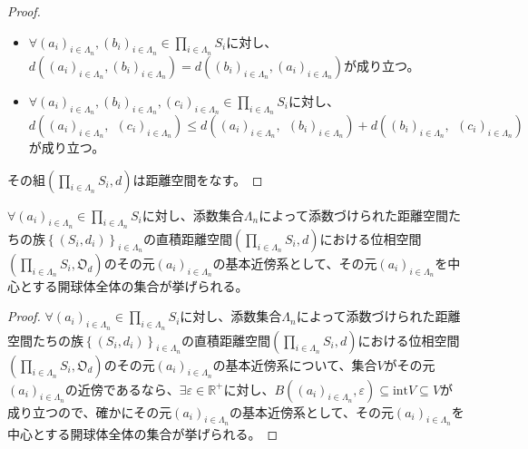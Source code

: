 \documentclass[dvipdfmx]{jsarticle}
\begin{document}
\begin{proof}
\begin{itemize}
\item
  $\forall\left( a_{i} \right)_{i \in \varLambda_{n}},\left( b_{i} \right)_{i \in \varLambda_{n}} \in \prod_{i \in \varLambda_{n}} S_{i}$に対し、$d\left( \left( a_{i} \right)_{i \in \varLambda_{n}},\left( b_{i} \right)_{i \in \varLambda_{n}} \right) = d\left( \left( b_{i} \right)_{i \in \varLambda_{n}},\left( a_{i} \right)_{i \in \varLambda_{n}} \right)$が成り立つ。
\item
  $\forall\left( a_{i} \right)_{i \in \varLambda_{n}},\left( b_{i} \right)_{i \in \varLambda_{n}},\left( c_{i} \right)_{i \in \varLambda_{n}} \in \prod_{i \in \varLambda_{n}} S_{i}$に対し、$d\left( \left( a_{i} \right)_{i \in \varLambda_{n}},\ \ \left( c_{i} \right)_{i \in \varLambda_{n}} \right) \leq d\left( \left( a_{i} \right)_{i \in \varLambda_{n}},\ \ \left( b_{i} \right)_{i \in \varLambda_{n}} \right) + d\left( \left( b_{i} \right)_{i \in \varLambda_{n}},\ \ \left( c_{i} \right)_{i \in \varLambda_{n}} \right)$が成り立つ。
\end{itemize}
その組$\left( \prod_{i \in \varLambda_{n}} S_{i},d \right)$は距離空間をなす。
\end{proof}
\begin{thm}\label{8.2.1.20}
$\forall\left( a_{i} \right)_{i \in \varLambda_{n}} \in \prod_{i \in \varLambda_{n}} S_{i}$に対し、添数集合$\varLambda_{n}$によって添数づけられた距離空間たちの族$\left\{ \left( S_{i},d_{i} \right) \right\}_{i \in \varLambda_{n}}$の直積距離空間$\left( \prod_{i \in \varLambda_{n}} S_{i},d \right)$における位相空間$\left( \prod_{i \in \varLambda_{n}} S_{i},\mathfrak{O}_{d} \right)$のその元$\left( a_{i} \right)_{i \in \varLambda_{n}}$の基本近傍系として、その元$\left( a_{i} \right)_{i \in \varLambda_{n}}$を中心とする開球体全体の集合が挙げられる。
\end{thm}
\begin{proof}
$\forall\left( a_{i} \right)_{i \in \varLambda_{n}} \in \prod_{i \in \varLambda_{n}} S_{i}$に対し、添数集合$\varLambda_{n}$によって添数づけられた距離空間たちの族$\left\{ \left( S_{i},d_{i} \right) \right\}_{i \in \varLambda_{n}}$の直積距離空間$\left( \prod_{i \in \varLambda_{n}} S_{i},d \right)$における位相空間$\left( \prod_{i \in \varLambda_{n}} S_{i},\mathfrak{O}_{d} \right)$のその元$\left( a_{i} \right)_{i \in \varLambda_{n}}$の基本近傍系について、集合$V$がその元$\left( a_{i} \right)_{i \in \varLambda_{n}}$の近傍であるなら、$\exists\varepsilon \in \mathbb{R}^{+}$に対し、$B\left( \left( a_{i} \right)_{i \in \varLambda_{n}},\varepsilon \right) \subseteq {\mathrm{int}}V \subseteq V$が成り立つので、確かにその元$\left( a_{i} \right)_{i \in \varLambda_{n}}$の基本近傍系として、その元$\left( a_{i} \right)_{i \in \varLambda_{n}}$を中心とする開球体全体の集合が挙げられる。
\end{proof}
\end{document}
